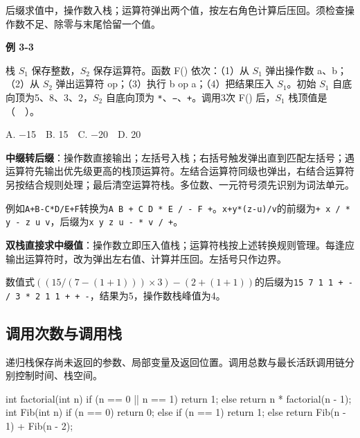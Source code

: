 后缀求值中，操作数入栈；运算符弹出两个值，按左右角色计算后压回。须检查操作数不足、除零与末尾恰留一个值。

\par\medskip{}\noindent\hypertarget{DS03-E05}{}\label{DS03-E05}\textbf{例 3-3}\par\nobreak\smallskip

栈 \(S_1\) 保存整数，\(S_2\) 保存运算符。函数 F() 依次：（1）从 \(S_1\) 弹出操作数 a、b；（2）从 \(S_2\) 弹出运算符 op；（3）执行 b op a；（4）把结果压入 \(S_1\)。初始 \(S_1\) 自底向顶为5、8、3、2，\(S_2\) 自底向顶为 \texttt{*\allowbreak{}}、\texttt{−}、\texttt{+\allowbreak{}}。调用3次 F() 后，\(S_1\) 栈顶值是（　）。

A. \ensuremath{-}15　B. 15　C. \ensuremath{-}20　D. 20

\textbf{中缀转后缀}：操作数直接输出；左括号入栈；右括号触发弹出直到匹配左括号；遇运算符先输出优先级更高的栈顶运算符。左结合运算符同级也弹出，右结合运算符另按结合规则处理；最后清空运算符栈。多位数、一元符号须先识别为词法单元。

例如\texttt{A+\allowbreak{}B-C*\allowbreak{}D/\allowbreak{}E+\allowbreak{}F}转换为\texttt{A B +\allowbreak{} C D *\allowbreak{} E /\allowbreak{} - F +\allowbreak{}}。\texttt{x+\allowbreak{}y*\allowbreak{}(\allowbreak{}z-u)\allowbreak{}/\allowbreak{}v}的前缀为\texttt{+\allowbreak{} x /\allowbreak{} *\allowbreak{} y - z u v}，后缀为\texttt{x y z u - *\allowbreak{} v /\allowbreak{} +\allowbreak{}}。

\textbf{双栈直接求中缀值}：操作数立即压入值栈；运算符栈按上述转换规则管理。每逢应输出运算符时，改为弹出左右值、计算并压回。左括号只作边界。

数值式\(((15/(7-(1+1)))\times3)-(2+(1+1))\)的后缀为\texttt{15 7 1 1 +\allowbreak{} - /\allowbreak{} 3 *\allowbreak{} 2 1 1 +\allowbreak{} +\allowbreak{} -}，结果为5，操作数栈峰值为4。

\subsection{调用次数与调用栈}\label{DS03-recursion}

递归栈保存尚未返回的参数、局部变量及返回位置。调用总数与最长活跃调用链分别控制时间、栈空间。

\par\smallskip\noindent\begin{minipage}{\linewidth}
\begin{codeblock}[language={C}]
int factorial(int n) {
    if (n == 0 || n == 1) return 1;
    else return n * factorial(n - 1);
}
int Fib(int n) {
    if (n == 0) return 0;
    else if (n == 1) return 1;
    else return Fib(n - 1) + Fib(n - 2);
}
\end{codeblock}
\end{minipage}\par\smallskip

